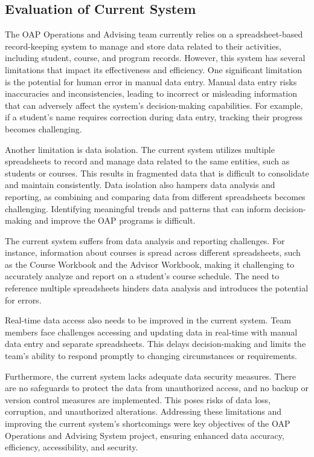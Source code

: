 \documentclass[12pt]{article}
\begin{document}
\subsection{Evaluation of Current System}
The OAP Operations and Advising team currently relies on a spreadsheet-based record-keeping system to manage and store data related to their activities, including student, course, and program records. However, this system has several limitations that impact its effectiveness and efficiency.
One significant limitation is the potential for human error in manual data entry. Manual data entry risks inaccuracies and inconsistencies, leading to incorrect or misleading information that can adversely affect the system's decision-making capabilities. For example, if a student's name requires correction during data entry, tracking their progress becomes challenging.

Another limitation is data isolation. The current system utilizes multiple spreadsheets to record and manage data related to the same entities, such as students or courses. This results in fragmented data that is difficult to consolidate and maintain consistently. Data isolation also hampers data analysis and reporting, as combining and comparing data from different spreadsheets becomes challenging. Identifying meaningful trends and patterns that can inform decision-making and improve the OAP programs is difficult.

The current system suffers from data analysis and reporting challenges. For instance, information about courses is spread across different spreadsheets, such as the Course Workbook and the Advisor Workbook, making it challenging to accurately analyze and report on a student's course schedule. The need to reference multiple spreadsheets hinders data analysis and introduces the potential for errors.

Real-time data access also needs to be improved in the current system. Team members face challenges accessing and updating data in real-time with manual data entry and separate spreadsheets. This delays decision-making and limits the team's ability to respond promptly to changing circumstances or requirements.

Furthermore, the current system lacks adequate data security measures. There are no safeguards to protect the data from unauthorized access, and no backup or version control measures are implemented. This poses risks of data loss, corruption, and unauthorized alterations.
Addressing these limitations and improving the current system's shortcomings were key objectives of the OAP Operations and Advising System project, ensuring enhanced data accuracy, efficiency, accessibility, and security.
\end{document}
